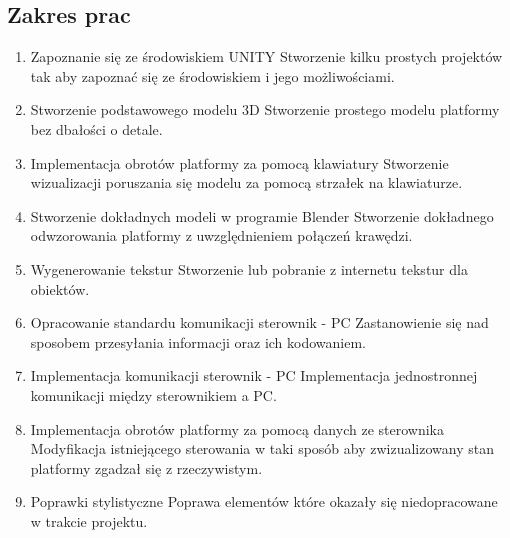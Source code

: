 \documentclass[10pt, a4paper]{article}
\begin{document}
	\subsection{Zakres prac}
		\begin{enumerate}
			\item Zapoznanie się ze środowiskiem UNITY
			\newline
			Stworzenie kilku prostych projektów tak aby zapoznać się ze środowiskiem i jego możliwościami.
			
			\item Stworzenie podstawowego modelu 3D
			\newline
			Stworzenie prostego modelu platformy bez dbałości o detale.
			
			\item Implementacja obrotów platformy za pomocą klawiatury
			\newline
			Stworzenie wizualizacji poruszania się modelu za pomocą strzałek na klawiaturze.
			
			\item Stworzenie dokładnych modeli w programie Blender
			\newline
			Stworzenie dokładnego odwzorowania platformy z uwzględnieniem połączeń krawędzi.
			
			\item Wygenerowanie tekstur
			\newline
			Stworzenie lub pobranie z internetu tekstur dla obiektów.
			
			\item Opracowanie standardu komunikacji sterownik - PC
			\newline
			Zastanowienie się nad sposobem przesyłania informacji oraz ich kodowaniem.
			
			\item Implementacja komunikacji sterownik - PC
			\newline
			Implementacja jednostronnej komunikacji między sterownikiem a PC.
			
			\item Implementacja obrotów platformy za pomocą danych ze sterownika
			\newline
			Modyfikacja istniejącego sterowania w taki sposób aby zwizualizowany stan platformy zgadzał się z rzeczywistym.
			
			\item Poprawki stylistyczne
			\newline
			Poprawa elementów które okazały się niedopracowane w trakcie projektu.
		\end{enumerate}
	
\end{document}
